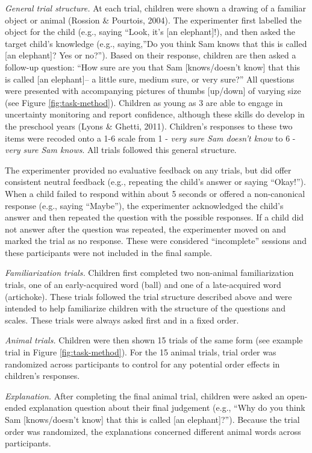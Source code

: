 \documentclass[10pt, letterpaper]{article}
\begin{document}
\emph{General trial structure.} At each trial, children were shown a
drawing of a familiar object or animal (Rossion \& Pourtois, 2004). The
experimenter first labelled the object for the child (e.g., saying
``Look, it's {[}an elephant{]}!), and then asked the target child's
knowledge (e.g., saying,''Do you think Sam knows that this is called
{[}an elephant{]}? Yes or no?''). Based on their response, children are
then asked a follow-up question: ``How sure are you that Sam
{[}knows/doesn't know{]} that this is called {[}an elephant{]}-- a
little sure, medium sure, or very sure?'' All questions were presented
with accompanying pictures of thumbs {[}up/down{]} of varying size (see
Figure \ref{fig:task-method}). Children as young as 3 are able to engage
in uncertainty monitoring and report confidence, although these skills
do develop in the preschool years (Lyons \& Ghetti, 2011). Children's
responses to these two items were recoded onto a 1-6 scale from 1 -
\emph{very sure Sam doesn't know} to 6 - \emph{very sure Sam knows}. All
trials followed this general structure.

The experimenter provided no evaluative feedback on any trials, but did
offer consistent neutral feedback (e.g., repeating the child's answer or
saying ``Okay!''). When a child failed to respond within about 5 seconds
or offered a non-canonical response (e.g., saying ``Maybe''), the
experimenter acknowledged the child's answer and then repeated the
question with the possible responses. If a child did not answer after
the question was repeated, the experimenter moved on and marked the
trial as no response. These were considered ``incomplete'' sessions and
these participants were not included in the final sample.

\emph{Familiarization trials.} Children first completed two non-animal
familiarization trials, one of an early-acquired word (ball) and one of
a late-acquired word (artichoke). These trials followed the trial
structure described above and were intended to help familiarize children
with the structure of the questions and scales. These trials were always
asked first and in a fixed order.

\emph{Animal trials.} Children were then shown 15 trials of the same
form (see example trial in Figure \ref{fig:task-method}). For the 15
animal trials, trial order was randomized across participants to control
for any potential order effects in children's responses.

\emph{Explanation.} After completing the final animal trial, children
were asked an open-ended explanation question about their final
judgement (e.g., ``Why do you think Sam {[}knows/doesn't know{]} that
this is called {[}an elephant{]}?''). Because the trial order was
randomized, the explanations concerned different animal words across
participants.
\end{document}
